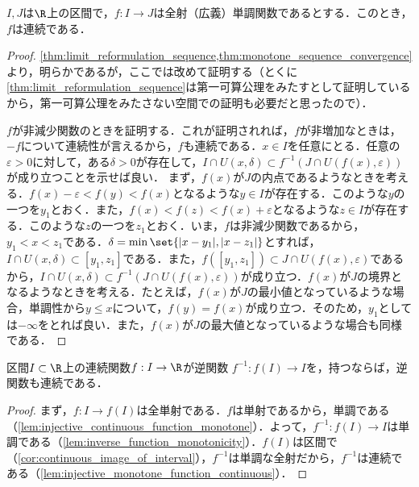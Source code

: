 \documentclass[a4paper,10pt]{ltjsarticle}
\begin{document}
\begin{MyLemma}
  \(I, J\)は\(\R\)上の区間で，\(f: I \to J\)は全射（広義）単調関数であるとする．このとき，\(f\)は連続である．
\end{MyLemma}
\begin{proof}
  \cref{thm:limit_reformulation_sequence,thm:monotone_sequence_convergence}より，明らかであるが，ここでは改めて証明する（とくに\cref{thm:limit_reformulation_sequence}は第一可算公理をみたすとして証明しているから，第一可算公理をみたさない空間での証明も必要だと思ったので）．

  \(f\)が非減少関数のときを証明する．これが証明されれば，\(f\)が非増加なときは，\(-f\)について連続性が言えるから，\(f\)も連続である．\(x \in I\)を任意にとる．任意の\(\varepsilon > 0\)に対して，ある\(\delta > 0\)が存在して，\(I \cap U(x, \delta) \subset f^{-1}(J \cap U(f(x), \varepsilon))\)が成り立つことを示せば良い．
  まず，\(f(x)\)が\(J\)の内点であるようなときを考える．\(f(x) - \varepsilon < f(y) < f(x)\)となるような\(y \in I\)が存在する．このような\(y\)の一つを\(y_1\)とおく．また，\(f(x) < f(z) < f(x) + \varepsilon\)となるような\(z \in I\)が存在する．このような\(z\)の一つを\(z_1\)とおく．いま，\(f\)は非減少関数であるから，\(y_1 < x < z_1\)である．\(\delta = \min\set{|x - y_1|, |x - z_1|}\)とすれば，\(I \cap U(x, \delta) \subset [y_1, z_1]\)である．また，\(f([y_1, z_1]) \subset J \cap U(f(x), \varepsilon)\)であるから，\(I \cap U(x, \delta) \subset f^{-1}(J \cap U(f(x), \varepsilon))\)が成り立つ．\(f(x)\)が\(J\)の境界となるようなときを考える．たとえば，\(f(x)\)が\(J\)の最小値となっているような場合，単調性から\(y \le x\)について，\(f(y) = f(x)\)が成り立つ．そのため，\(y_1\)としては\(-\infty\)をとれば良い．また，\(f(x)\)が\(J\)の最大値となっているような場合も同様である．
\end{proof}

\begin{MyTheorem}
  区間\(I \subset \R\)上の連続関数\(f: I \to \R\)が逆関数
  \(f^{-1}: f(I) \to I\)を，持つならば，逆関数も連続である．
\end{MyTheorem}
\begin{proof}
  まず，\(f: I \to f(I)\)は全単射である．\(f\)は単射であるから，単調である（\cref{lem:injective_continuous_function_monotone}）．よって，\(f^{-1} : f(I) \to I\)は単調である（\cref{lem:inverse_function_monotonicity}）．\(f(I)\)は区間で（\cref{cor:continuous_image_of_interval}），\(f^{-1}\)は単調な全射だから，\(f^{-1}\)は連続である（\cref{lem:injective_monotone_function_continuous}）．
\end{proof}
\end{document}
